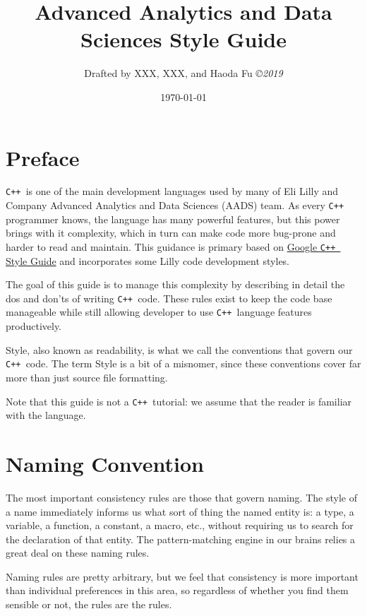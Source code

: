 \documentclass[12pt,reqno]{book}      %
\title{Advanced Analytics and Data Sciences  \Cpp Style Guide}
\author{\htmladdnormallink           %
{Drafted by XXX, XXX, and Haoda Fu}{}
{\small\em \copyright 2019}}
\date{\today}
\def\Cpp{\texttt{C++ }}
\begin{document}
\maketitle
\tableofcontents
\listoffigures
\listoftables
\chapter*{Preface}\normalsize
\pagestyle{plain}
\Cpp is one of the main development languages used by many of Eli Lilly and Company Advanced Analytics and Data Sciences (AADS)  team. As every \Cpp programmer knows, the language has many powerful features, but this power brings with it complexity, which in turn can make code more bug-prone and harder to read and maintain. This guidance is primary based on \href{https://google.github.io/styleguide/cppguide.html}{Google \Cpp Style Guide} and incorporates some Lilly code development styles. 

The goal of this guide is to manage this complexity by describing in detail the dos and don'ts of writing \Cpp code. These rules exist to keep the code base manageable while still allowing developer to use \Cpp language features productively.

Style, also known as readability, is what we call the conventions that govern our \Cpp code. The term Style is a bit of a misnomer, since these conventions cover far more than just source file formatting.

Note that this guide is not a \Cpp tutorial: we assume that the reader is familiar with the language.

\pagestyle{headings}

\chapter{Naming Convention}
The most important consistency rules are those that govern naming. The style of a name immediately informs us what sort of thing the named entity is: a type, a variable, a function, a constant, a macro, etc., without requiring us to search for the declaration of that entity. The pattern-matching engine in our brains relies a great deal on these naming rules.

Naming rules are pretty arbitrary, but we feel that consistency is more important than individual preferences in this area, so regardless of whether you find them sensible or not, the rules are the rules.
\end{document}
